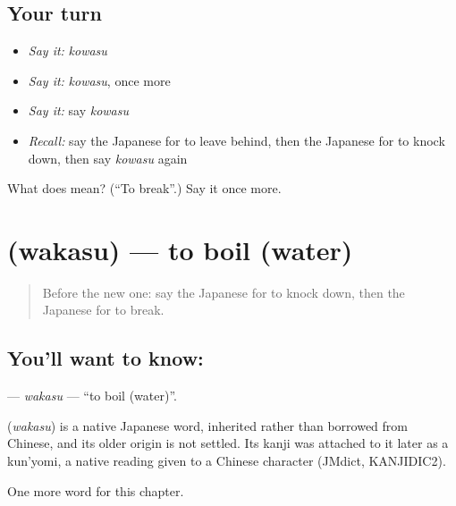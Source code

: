 \subsection*{Your turn}
\begin{itemize}
\raggedright
  \item \emph{Say it:} \emph{kowasu}
  \item \emph{Say it:} \emph{kowasu}, once more
  \item \emph{Say it:} say \emph{kowasu}
  \item \emph{Recall:} say the Japanese for to leave behind, then the Japanese for to knock down, then say \emph{kowasu} again
\end{itemize}

\begin{tcolorbox}[breakable,colback=teal!4,colframe=teal!35!black,title={Before you move on}]
What does  mean? (\textquotedblleft{}To break\textquotedblright{}.) Say it once more.
\end{tcolorbox}
\section[\texorpdfstring{\ja{わかす} (wakasu)}{わかす (wakasu)}]{ (wakasu) — to boil (water)}

\label{lesson:JA-C89-wakasu}



\begin{quote}
Before the new one: say the Japanese for to knock down, then the Japanese for to break.
\end{quote}

\subsection*{You'll want to know: }
\textbf{} — \emph{wakasu} — \textquotedblleft{}to boil (water)\textquotedblright{}.

\begin{cousinweb}
\textbf{} (\emph{wakasu}) is a native Japanese word, inherited rather than borrowed from Chinese, and its older origin is not settled. Its kanji was attached to it later as a kun'yomi, a native reading given to a Chinese character (JMdict, KANJIDIC2).
\end{cousinweb}

\begin{grammarlens}[title={What you've built}]
One more word for this chapter.
\end{grammarlens}

